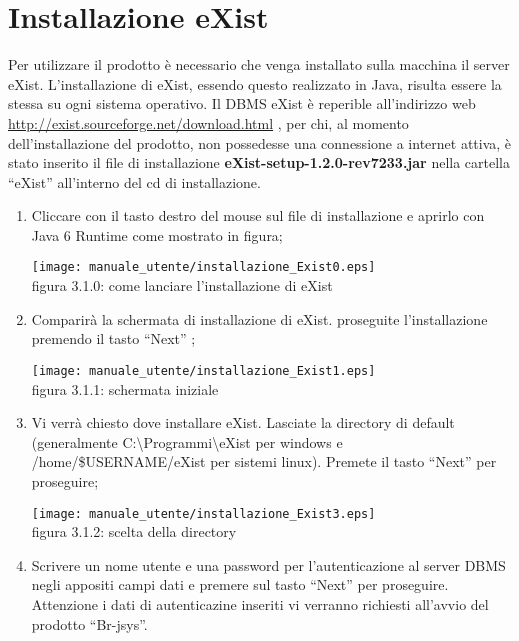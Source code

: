 \section{Installazione eXist}
Per utilizzare il prodotto \`e necessario che venga installato sulla macchina il server eXist. L'installazione di eXist, essendo questo realizzato in Java, risulta essere la stessa su ogni sistema operativo.
Il DBMS eXist \`e reperible all'indirizzo web \href{http://exist.sourceforge.net/download.html}{http://exist.sourceforge.net/download.html} , per chi, al momento dell'installazione del prodotto, non possedesse una connessione a internet attiva, \`e stato inserito il file di installazione \textbf{eXist-setup-1.2.0-rev7233.jar} nella cartella ``eXist'' all'interno del cd di installazione.
\begin{enumerate}
\item Cliccare con il tasto destro del mouse sul file di installazione e aprirlo con Java 6 Runtime come mostrato in figura;
\begin{center}
\texttt{[image: manuale\_utente/installazione\_Exist0.eps]}\\
 figura 3.1.0: come lanciare l'installazione di eXist
\end{center}
\item Comparir\`a la schermata di installazione di eXist. proseguite l'installazione premendo il tasto ``Next'' ;
\begin{center}
\texttt{[image: manuale\_utente/installazione\_Exist1.eps]}\\
 figura 3.1.1: schermata iniziale
\end{center}
\item Vi verr\`a chiesto dove installare eXist. Lasciate la directory di default (generalmente C:\textbackslash Programmi\textbackslash eXist per windows e  /home/\$USERNAME/eXist per sistemi linux). Premete il tasto ``Next'' per proseguire;
\begin{center}
\texttt{[image: manuale\_utente/installazione\_Exist3.eps]}\\
 figura 3.1.2: scelta della directory
\end{center}
\item Scrivere un nome utente e una password per l'autenticazione al server DBMS negli appositi campi dati e premere sul tasto ``Next'' per proseguire. Attenzione i dati di autenticazine inseriti vi verranno richiesti all'avvio del prodotto ``Br-jsys''.
\begin{center}

\end{center}
\end{enumerate}
